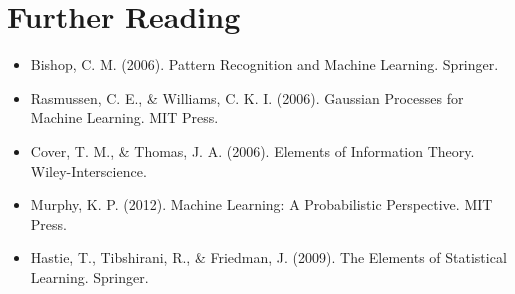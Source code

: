 \documentclass{article}
\begin{document}
\section*{Further Reading}

\begin{itemize}
\item Bishop, C. M. (2006). Pattern Recognition and Machine Learning. Springer.
\item Rasmussen, C. E., \& Williams, C. K. I. (2006). Gaussian Processes for Machine Learning. MIT Press.
\item Cover, T. M., \& Thomas, J. A. (2006). Elements of Information Theory. Wiley-Interscience.
\item Murphy, K. P. (2012). Machine Learning: A Probabilistic Perspective. MIT Press.
\item Hastie, T., Tibshirani, R., \& Friedman, J. (2009). The Elements of Statistical Learning. Springer.
\end{itemize}
\end{document}
